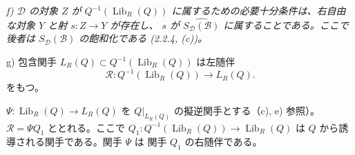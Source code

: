 \clearpage
{}%
\begingroup
\small
\setlength{\parskip}{0pt}%
\setlength{\emergencystretch}{1.5em}%
\setlength{\abovedisplayskip}{3pt plus 1pt minus 1pt}%
\setlength{\belowdisplayskip}{3pt plus 1pt minus 1pt}%
\sloppy

\begingroup\itshape
{}
\noindent f) $\mathcal D$ の対象 $Z$ が
$Q^{-1}(\operatorname{Lib}_R(Q))$ に属するための必要十分条件は、右自由な対象
$Y$ と射 $s\colon Z\longrightarrow Y$ が存在し、
$s$ が $\widehat{S_{\mathcal D}(\mathcal B)}$ に属することである。ここで後者は
$S_{\mathcal D}(\mathcal B)$ の飽和化である (2.2.4, (c))。
\par\noindent g) 包含関手
$L_R(Q)\subset Q^{-1}(\operatorname{Lib}_R(Q))$ は左随伴
\[
  \mathcal R\colon Q^{-1}(\operatorname{Lib}_R(Q))\longrightarrow L_R(Q)
  .
\]
をもつ。
\begin{center}
\end{center}
\endgroup

$\Psi\colon\operatorname{Lib}_R(Q)\longrightarrow L_R(Q)$ を
$Q|_{L_R(Q)}$ の擬逆関手とする（c), e) 参照）。
$\mathcal R=\Psi Q_1$ ととれる。ここで
$Q_1\colon Q^{-1}(\operatorname{Lib}_R(Q))\longrightarrow
\operatorname{Lib}_R(Q)$ は $Q$ から誘導される関手である。関手 $\Psi$ は
関手 $Q_1$ の右随伴である。

